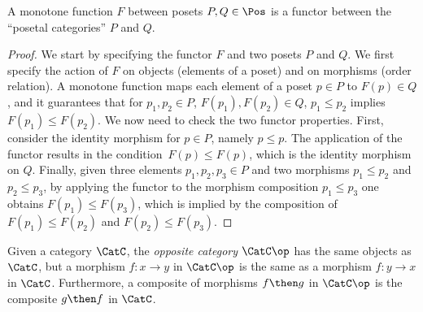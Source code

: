\begin{lemma}
\label{lemma:posetfunctor}
A monotone function $F$ between posets $P,Q \in \Pos$ is a functor between the ``posetal categories'' $P$ and $Q$.
\end{lemma}
\begin{proof}
We start by specifying the functor $F$ and two posets $P$ and $Q$. We first specify the action of $F$ on objects (elements of a poset) and on morphisms (order relation). A monotone function maps each element of a poset $p\in P$ to $F(p) \in Q$, and it guarantees that for $p_1,p_2\in P$, $F(p_1),F(p_2)\in Q$,  $p_1\leq p_2$ implies $F(p_1)\leq F(p_2)$. We now need to check the two functor properties. First, consider the identity morphism for $p\in P$, namely $p\leq p$. The application of the functor results in the condition~$F(p)\leq F(p)$, which is the identity morphism on $Q$. Finally, given three elements $p_1,p_2,p_3\in P$ and two morphisms $p_1\leq p_2$ and $p_2\leq p_3$, by applying the functor to the morphism composition $p_1\leq p_3$ one obtains $F(p_1)\leq F(p_3)$, which is implied by the composition of $F(p_1)\leq F(p_2)$ and $F(p_2)\leq F(p_3)$.
\end{proof}

\begin{shaded}
\begin{definition}
\label{def:oppositecat}
Given a category $\CatC$, the \emph{opposite category} $\CatC\op$ has the same objects as $\CatC$, but a morphism $f\colon x\to y$ in $\CatC\op$ is the same as a morphism $f\colon y\to x$ in $\CatC$. Furthermore, a composite of morphisms $f\then g$ in $\CatC\op$ is the composite $g\then f$ in $\CatC$.
\end{definition}
\end{shaded}

